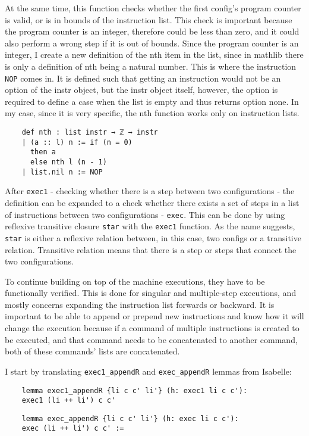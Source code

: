 
At the same time, this function checks whether the first config's program counter is valid, or is in bounds of the instruction list. This check is important because the program counter is an integer, therefore could be less than zero, and it could also perform a wrong step if it is out of bounds. Since the program counter is an integer, I create a new definition of the nth item in the list, since in mathlib \cite{mathlib} there is only a definition of nth being a natural number. This is where the instruction \lstinline{NOP} comes in. It is defined such that getting an instruction would not be an option of the instr object, but the instr object itself, however, the option is required to define a case when the list is empty and thus returns option none. In my case, since it is very specific, the nth function works only on instruction lists.  
\begin{lstlisting}
    def nth : list instr → ℤ → instr  
    | (a :: l) n := if (n = 0) 
      then a
      else nth l (n - 1)
    | list.nil n := NOP
\end{lstlisting}

After \lstinline{exec1} - checking whether there is a step between two configurations - the definition can be expanded to a check whether there exists a set of steps in a list of instructions between two configurations - \lstinline{exec}. This can be done by using reflexive transitive closure \lstinline{star} with the \lstinline{exec1} function. As the name suggests, \lstinline{star} is either a reflexive relation between, in this case, two configs or a transitive relation. Transitive relation means that there is a step or steps that connect the two configurations. 

To continue building on top of the machine executions, they have to be functionally verified. This is done for singular and multiple-step executions, and mostly concerns expanding the instruction list forwards or backward. It is important to be able to append or prepend new instructions and know how it will change the execution because if a command of multiple instructions is created to be executed, and that command needs to be concatenated to another command, both of these commands' lists are concatenated.

I start by translating \lstinline{exec1_appendR} and \lstinline{exec_appendR} lemmas from Isabelle:
\begin{lstlisting}
    lemma exec1_appendR {li c c' li'} (h: exec1 li c c'): 
    exec1 (li ++ li') c c'
\end{lstlisting}
\begin{lstlisting}
    lemma exec_appendR {li c c' li'} (h: exec li c c'):
    exec (li ++ li') c c' :=
\end{lstlisting}

